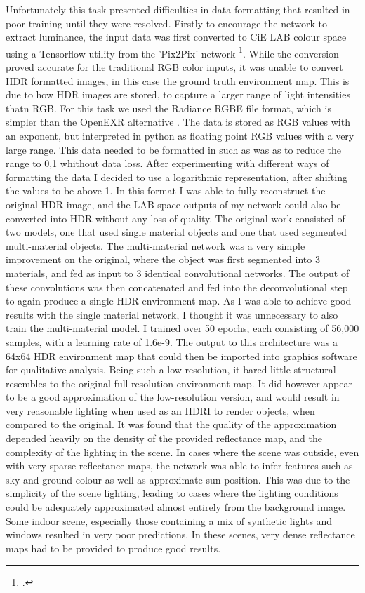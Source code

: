 \documentclass[ %
                    author={Gavin Parker},
                supervisor={Dr. Neill Campbell},
                    degree={MEng},
                     title={Deep Siamese Networks for Illumination Estimation from Stereo Images},
                  subtitle={},
                      type={research},
                      year={2018} ]{dissertation}
\begin{document}
\newline
Unfortunately this task presented difficulties in data formatting that resulted in poor training until they were resolved. Firstly to encourage the network to extract luminance, the input data was first converted to CiE LAB colour space using a Tensorflow utility from the 'Pix2Pix' network \footcite{https://github.com/affinelayer/pix2pix-tensorflow/blob/master/pix2pix.py}. While the conversion proved accurate for the traditional RGB color inputs, it was unable to convert HDR formatted images, in this case the ground truth environment map. This is due to how HDR images are stored, to capture a larger range of light intensities thatn RGB. For this task we used the Radiance RGBE file format, which is simpler than the OpenEXR alternative . The data is stored as RGB values with an exponent, but interpreted in python as floating point RGB values with a very large range. This data needed to be formatted in such as was as to reduce the range to 0,1 whithout data loss. After experimenting with different ways of formatting the data I decided to use a logarithmic representation, after shifting the values to be above 1. In this format I was able to fully reconstruct the original HDR image, and the LAB space outputs of my network could also be converted into HDR without any loss of quality.
\newline
The original work consisted of two models, one that used single material objects and one that used segmented multi-material objects. The multi-material network was a very simple improvement on the original, where the object was first segmented into 3 materials, and fed as input to 3 identical convolutional networks. The output of these convolutions was then concatenated and fed into the deconvolutional step to again produce a single HDR environment map. As I was able to achieve good results with the single material network, I thought it was unnecessary to also train the multi-material model. I trained over 50 epochs, each consisting of 56,000 samples, with a learning rate of 1.6e-9. The output to this architecture was a 64x64 HDR environment map that could then be imported into graphics software for qualitative analysis. Being such a low resolution, it bared little structural resembles to the original full resolution environment map. It did however appear to be a good approximation of the low-resolution version, and would result in very reasonable lighting when used as an HDRI to render objects, when compared to the original. It was found that the quality of the approximation depended heavily on the density of the provided reflectance map, and the complexity of the lighting in the scene. In cases where the scene was outside, even with very sparse reflectance maps, the network was able to infer features such as sky and ground colour as well as approximate sun position. This was due to the simplicity of the scene lighting, leading to cases where the lighting conditions could be adequately approximated almost entirely from the background image. Some indoor scene, especially those containing a mix of synthetic lights and windows resulted in very poor predictions. In these scenes, very dense reflectance maps had to be provided to produce good results. 
\end{document}
